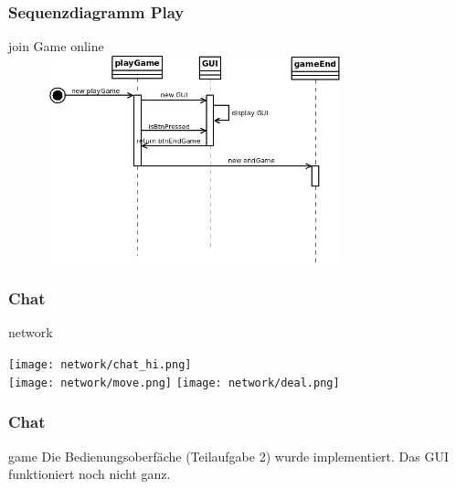 \documentclass{beamer}
\begin{document}
	    \label{Frame5}	
		\begin{frame}
			\frametitle{Sequenzdiagramm Play}
			\begin{block}{join Game online}
				\includegraphics[width = 10.8cm, height = 6cm]{aufgabe1/SequenzdiagrammPlay.jpeg}
			\end{block}		
		\end{frame}


	    \label{Frame6}	
		\begin{frame}
			\frametitle{Chat}
			\begin{block}{network}
				\begin{center}
				\texttt{[image: network/chat\_hi.png]}\\
				\texttt{[image: network/move.png]}
				\texttt{[image: network/deal.png]}
			\end{center}
			\end{block}		
		\end{frame}

	    \label{Frame6}	
		\begin{frame}
			\frametitle{Chat}
			\begin{block}{game}
				Die Bedienungsoberfäche (Teilaufgabe 2) wurde implementiert. Das GUI funktioniert noch nicht ganz.
			\end{block}		
		\end{frame}
\end{document}
